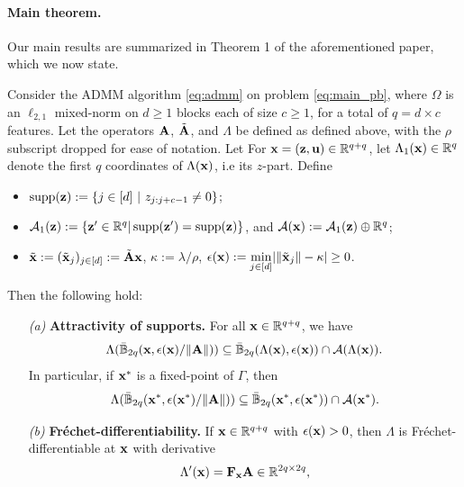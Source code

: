\paragraph{Main theorem.} Our main results are summarized in Theorem 1 of the aforementioned paper, which we now state.
\begin{theorem} Consider the ADMM algorithm \eqref{eq:admm} on problem
  \eqref{eq:main_pb}, where $\Omega$ is an $\ell_{2,1}$ mixed-norm on
  $d \ge 1$ blocks each of size $c \ge 1$, for a total of $q = d
  \times c$ features. Let the operators $\mathbf{A}$, $\tilde{\mathbf{A}}$, and $\Lambda$ be
  defined as defined above, with the $\rho$ subscript
  dropped for ease of notation. Let For $\mathbf{x} = (\mathbf{z}, \mathbf{u}) \in\mathbb{R}^{q+q}$, let $\Lambda_1(\mathbf{x}) \in \mathbb R^q$ denote the first $q$ coordinates of $\Lambda(\mathbf{x})$, i.e its $z$-part. Define
  \begin{itemize}
    \item $\operatorname{supp}(\mathbf{z}) := \{j\in[d]\text{ }|\text{ }z_{j:j+c-1} \ne
      0\}$;
      \item $\mathcal{A}_1(\mathbf{z}) := \{\mathbf{z}' \in \mathbb{R}^{q} |
    \operatorname{supp}(\mathbf{z}') = \operatorname{supp}(\mathbf{z})\}$, and $\mathcal A(\mathbf{x}) := \mathcal A_1(\mathbf{z}) \oplus \mathbb R^q$;
   \item $\tilde{\mathbf{x}} := (\tilde{\mathbf{x}}_j)_{j \in [d]} := \tilde{\mathbf{A}}\mathbf{x}$, $\kappa :=
    \lambda / \rho$, $\epsilon(\mathbf{x}) :=
      \underset{j \in [d]}{\min}\text{}|\|\tilde{\mathbf{x}}_j\|-\kappa| \ge 0$.
    \end{itemize}
Then the following hold:
\begin{itemize}
\item[\textit{(a)}] \textbf{Attractivity of supports.} For all $\mathbf{x} \in
  \mathbb{R}^{q+q}$, we have
  \[\Lambda(\bar{\mathbb{B}}_{2q}(\mathbf{x},\epsilon(\mathbf{x})/\|\mathbf{A}\|)) \subseteq
  \bar{\mathbb{B}}_{2q}(\Lambda(\mathbf{x}),\epsilon(\mathbf{x})) \cap
  \mathcal{A}(\Lambda(\mathbf{x})).\] In
  particular, if $\mathbf{x}^*$ is a fixed-point of $\Gamma$, then
  \[
  \Lambda(\bar{\mathbb{B}}_{2q}(\mathbf{x}^*,\epsilon(\mathbf{x}^*)/\|\mathbf{A}\|))
  \subseteq
  \bar{\mathbb{B}}_{2q}(\mathbf{x}^*,\epsilon(\mathbf{x}^*)) \cap \mathcal{A}(\mathbf{x}^*).
  \]
\item[\textit{(b)}] \textbf{Fr\'echet-differentiability.} If $\mathbf{x} \in
  \mathbb{R}^{q+q}$ with
  $\epsilon(\mathbf{x}) > 0$, then $\Lambda$ is Fr\'echet-differentiable at $\mathbf{x}$ with
  derivative
\begin{eqnarray}
  \Lambda'(\mathbf{x}) = \mathbf{F}_{\mathbf{x}}\mathbf{A} \in \mathbb{R}^{2q \times 2q},
\label{eq:linear}
\end{eqnarray}

\end{itemize}
\end{theorem}
